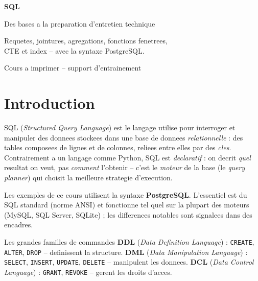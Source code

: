 \documentclass[11pt,a4paper]{article}
\begin{document}
\begin{titlepage}
\centering
\vspace*{3cm}
{\color{primary}\Huge\bfseries SQL\par}
\vspace{0.6cm}
{\color{accent}\LARGE Des bases a la preparation d'entretien technique\par}
\vspace{1.2cm}
{\large Requetes, jointures, agregations, fonctions fenetrees,\\
CTE et index -- avec la syntaxe PostgreSQL.\par}
\vfill
{\color{codecom}\large Cours a imprimer -- support d'entrainement\par}
\vspace{2cm}
\end{titlepage}

\tableofcontents
\newpage

\section{Introduction}
SQL (\emph{Structured Query Language}) est le langage utilise pour interroger et
manipuler des donnees stockees dans une base de donnees \emph{relationnelle} :
des tables composees de lignes et de colonnes, reliees entre elles par des
\emph{cles}. Contrairement a un langage comme Python, SQL est \emph{declaratif} :
on decrit \emph{quel} resultat on veut, pas \emph{comment} l'obtenir -- c'est le
\emph{moteur} de la base (le \emph{query planner}) qui choisit la meilleure
strategie d'execution.

Les exemples de ce cours utilisent la syntaxe \textbf{PostgreSQL}. L'essentiel
est du SQL standard (norme ANSI) et fonctionne tel quel sur la plupart des
moteurs (MySQL, SQL Server, SQLite) ; les differences notables sont signalees
dans des encadres.

\begin{infobox}{Les grandes familles de commandes}
\textbf{DDL} (\emph{Data Definition Language}) : \texttt{CREATE}, \texttt{ALTER},
\texttt{DROP} -- definissent la structure. \textbf{DML} (\emph{Data Manipulation
Language}) : \texttt{SELECT}, \texttt{INSERT}, \texttt{UPDATE}, \texttt{DELETE}
-- manipulent les donnees. \textbf{DCL} (\emph{Data Control Language}) :
\texttt{GRANT}, \texttt{REVOKE} -- gerent les droits d'acces.
\end{infobox}
\end{document}
